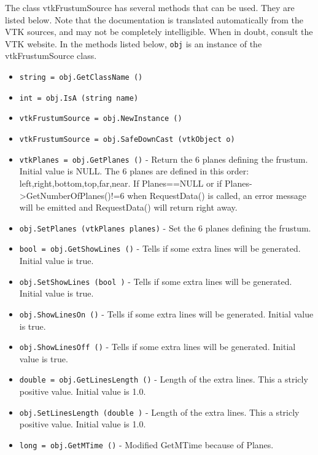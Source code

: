 The class vtkFrustumSource has several methods that can be used.
  They are listed below.
Note that the documentation is translated automatically from the VTK sources,
and may not be completely intelligible.  When in doubt, consult the VTK website.
In the methods listed below, \verb|obj| is an instance of the vtkFrustumSource class.
\begin{itemize}
\item  \verb|string = obj.GetClassName ()|

\item  \verb|int = obj.IsA (string name)|

\item  \verb|vtkFrustumSource = obj.NewInstance ()|

\item  \verb|vtkFrustumSource = obj.SafeDownCast (vtkObject o)|

\item  \verb|vtkPlanes = obj.GetPlanes ()| -  Return the 6 planes defining the frustum. Initial value is NULL.
 The 6 planes are defined in this order: left,right,bottom,top,far,near.
 If Planes==NULL or if Planes->GetNumberOfPlanes()!=6 when RequestData()
 is called, an error message will be emitted and RequestData() will
 return right away.

\item  \verb|obj.SetPlanes (vtkPlanes planes)| -  Set the 6 planes defining the frustum.

\item  \verb|bool = obj.GetShowLines ()| -  Tells if some extra lines will be generated. Initial value is true.

\item  \verb|obj.SetShowLines (bool )| -  Tells if some extra lines will be generated. Initial value is true.

\item  \verb|obj.ShowLinesOn ()| -  Tells if some extra lines will be generated. Initial value is true.

\item  \verb|obj.ShowLinesOff ()| -  Tells if some extra lines will be generated. Initial value is true.

\item  \verb|double = obj.GetLinesLength ()| -  Length of the extra lines. This a stricly positive value.
 Initial value is 1.0.

\item  \verb|obj.SetLinesLength (double )| -  Length of the extra lines. This a stricly positive value.
 Initial value is 1.0.

\item  \verb|long = obj.GetMTime ()| -  Modified GetMTime because of Planes.

\end{itemize}
